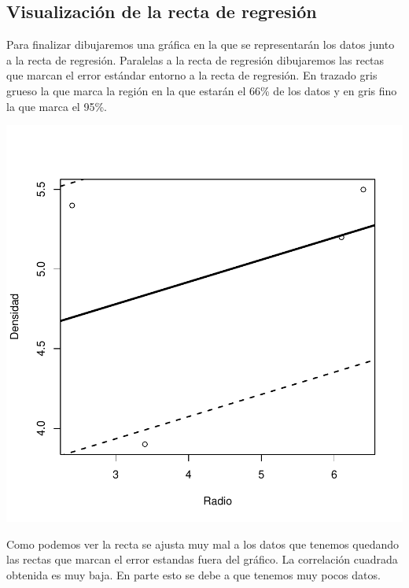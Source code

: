 \documentclass [a4paper] {article}
\begin{document}
\subsection{Visualización de la recta de regresión}
Para finalizar dibujaremos una gráfica en la que se representarán los datos junto a la recta de regresión.
Paralelas a la recta de regresión dibujaremos las rectas que marcan el error estándar entorno a la recta de regresión.
En trazado gris grueso la que marca la región en la que estarán el 66\% de los datos y en gris fino la que marca el 95\%.
\begin{center}
\includegraphics{entrega-plot_regresion2}
\end{center}

Como podemos ver la recta se ajusta muy mal a los datos que tenemos quedando las rectas que marcan el error estandas fuera del gráfico.
La correlación cuadrada obtenida es muy baja.
En parte esto se debe a que tenemos muy pocos datos.

\newpage
\end{document}

